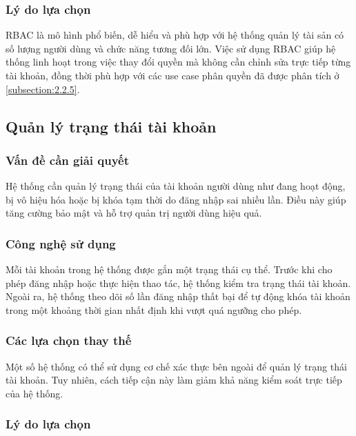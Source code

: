 \documentclass[../DoAn.tex]{subfiles}
\begin{document}
\subsubsection{Lý do lựa chọn}

RBAC là mô hình phổ biến, dễ hiểu và phù hợp với hệ thống quản lý tài sản có số lượng người dùng và chức năng tương đối lớn. Việc sử dụng RBAC giúp hệ thống linh hoạt trong việc thay đổi quyền mà không cần chỉnh sửa trực tiếp từng tài khoản, đồng thời phù hợp với các use case phân quyền đã được phân tích ở \autoref{subsection:2.2.5}.

\subsection{Quản lý trạng thái tài khoản}

\subsubsection{Vấn đề cần giải quyết}

Hệ thống cần quản lý trạng thái của tài khoản người dùng như đang hoạt động, bị vô hiệu hóa hoặc bị khóa tạm thời do đăng nhập sai nhiều lần. Điều này giúp tăng cường bảo mật và hỗ trợ quản trị người dùng hiệu quả.

\subsubsection{Công nghệ sử dụng}

Mỗi tài khoản trong hệ thống được gắn một trạng thái cụ thể. Trước khi cho phép đăng nhập hoặc thực hiện thao tác, hệ thống kiểm tra trạng thái tài khoản. Ngoài ra, hệ thống theo dõi số lần đăng nhập thất bại để tự động khóa tài khoản trong một khoảng thời gian nhất định khi vượt quá ngưỡng cho phép.

\subsubsection{Các lựa chọn thay thế}

Một số hệ thống có thể sử dụng cơ chế xác thực bên ngoài để quản lý trạng thái tài khoản. Tuy nhiên, cách tiếp cận này làm giảm khả năng kiểm soát trực tiếp của hệ thống.

\subsubsection{Lý do lựa chọn}
\end{document}
